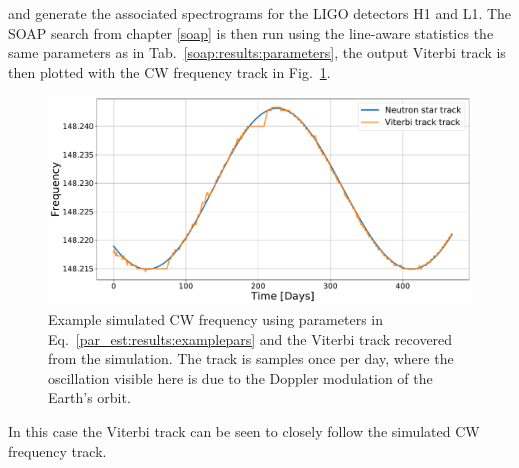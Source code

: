 and generate the associated spectrograms for the \gls{LIGO} detectors H1 and L1.
The SOAP search from chapter \ref{soap} is then run using the line-aware statistics the same parameters as in Tab.~\ref{soap:results:parameters}, the output Viterbi track is then plotted with the \gls{CW} frequency track in Fig.~\ref{par_est:results:freqtrack}. 
%
\begin{figure}[ht]

    \centering
    \includegraphics[width=\linewidth]{C5_parameter/example_freqtrack.pdf}
    \caption[Frequency track of injected signal]{ Example simulated \gls{CW} frequency using parameters in Eq.~\ref{par_est:results:examplepars} and the Viterbi track recovered from the simulation. The track is samples once per day, where the oscillation visible here is due to the Doppler modulation of the Earth's orbit.}
    \label{par_est:results:freqtrack}
    
\end{figure}
%
In this case the Viterbi track can be seen to closely follow the simulated \gls{CW} frequency track.

